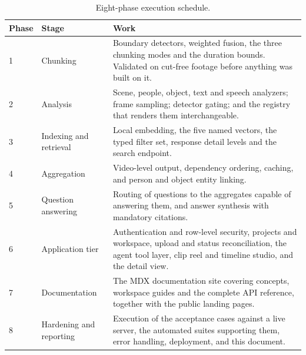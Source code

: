 \documentclass[11pt,a4paper]{article}
\begin{document}
\begin{table}[htbp]
\centering
\small
\begin{tabularx}{\textwidth}{@{}L{1.7cm}L{3.6cm}X@{}}
\toprule
\textbf{Phase} & \textbf{Stage} & \textbf{Work} \\
 & Chunking & Boundary detectors, weighted fusion, the three chunking modes and the duration bounds. Validated on cut-free footage before anything was built on it. \\
2 & Analysis & Scene, people, object, text and speech analyzers; frame sampling; detector gating; and the registry that renders them interchangeable. \\
3 & Indexing and retrieval & Local embedding, the five named vectors, the typed filter set, response detail levels and the search endpoint. \\
4 & Aggregation & Video-level output, dependency ordering, caching, and person and object entity linking. \\
5 & Question answering & Routing of questions to the aggregates capable of answering them, and answer synthesis with mandatory citations. \\
6 & Application tier & Authentication and row-level security, projects and workspace, upload and status reconciliation, the agent tool layer, clip reel and timeline studio, and the detail view. \\
7 & Documentation & The MDX documentation site covering concepts, workspace guides and the complete API reference, together with the public landing pages. \\
8 & Hardening and reporting & Execution of the acceptance cases against a live server, the automated suites supporting them, error handling, deployment, and this document. \\
\bottomrule
\end{tabularx}
\caption{Eight-phase execution schedule.}
\end{table}
\end{document}
